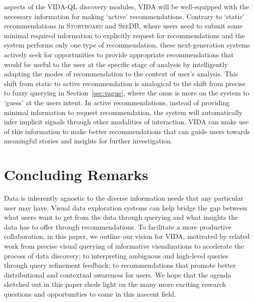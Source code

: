 \documentclass[11pt]{article}
\newcommand{\vida}{\textsc{VIDA}\xspace}
\newcommand{\vidaql}{\textsc{VIDA-QL}\xspace}
\newcommand{\sbd}{\textsc{Storyboard}\xspace}
\newcommand{\seedb}{\textsc{SeeDB}\xspace}
\begin{document}
aspects of the \vidaql discovery modules, 
\vida will be well-equipped with the necessary 
information for making `active' recommendations. 
Contrary to `static' recommendations in \sbd and \seedb, 
where users need to submit some minimal required 
information to explicitly request 
for recommendations and the system 
performs only one type of recommendation, 
these next-generation systems 
actively seek for opportunities to 
provide appropriate recommendations 
that would be useful to the user at the 
specific stage of analysis by intelligently 
adapting the modes of recommendation 
to the context of user's analysis. 
This shift from static to active recommendation is analogical to the shift from precise to fuzzy querying in Section~\ref{sec:vague}, where the onus is more on the system to `guess' at the users intent. 
In active recommendations, instead of providing 
minimal information to request recommendation, 
the system will automatically infer implicit 
signals through other modalities of interaction. 
\vida can make use of this information to 
make better recommendations that can guide users 
towards meaningful stories and insights for further investigation.

\section{Concluding Remarks\label{sec:conclusion}}
\par Data is inherently agnostic to the diverse information needs that any particular user may have. 
Visual data exploration systems can 
help bridge the gap between what users want to 
get from the data through querying and 
what insights the data has to offer through recommendations. 
To facilitate a more productive collaboration, 
in this paper, we outline our vision for \vida, motivated by related work 
from precise visual querying of informative visualizations 
to accelerate the process of data discovery; 
to interpreting ambiguous and high-level queries 
through query refinement feedback; to recommendations that promote better distributional 
and contextual awareness for users. 
We hope that the agenda sketched out in this paper 
sheds light on the many more exciting research 
questions and opportunities 
to come in this nascent field.
\end{document}
